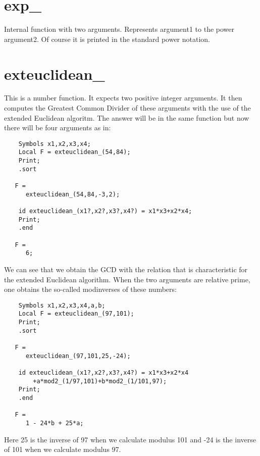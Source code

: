
\section{exp\_}
\label{funexp}
\noindent Internal function with two arguments. Represents 
argument1 to the power argument2. Of course it is printed in the standard 
power notation.


\section{exteuclidean\_}
\label{funexteuclidean}

\noindent This is a number function. It expects two positive integer 
arguments. It then computes the Greatest Common Divider of these arguments 
with the use of the extended Euclidean algoritm. The answer will be in the 
same function but now there will be four arguments as in:
\begin{verbatim}
    Symbols x1,x2,x3,x4;
    Local F = exteuclidean_(54,84);
    Print;
    .sort

   F =
      exteuclidean_(54,84,-3,2);

    id exteuclidean_(x1?,x2?,x3?,x4?) = x1*x3+x2*x4;
    Print;
    .end

   F =
      6;
\end{verbatim}
\noindent We can see that we obtain the GCD with the relation that is 
characteristic for the extended Euclidean algorithm. When the two arguments 
are relative prime, one obtains the so-called modinverses of these numbers:
\begin{verbatim}
    Symbols x1,x2,x3,x4,a,b;
    Local F = exteuclidean_(97,101);
    Print;
    .sort

   F =
      exteuclidean_(97,101,25,-24);

    id exteuclidean_(x1?,x2?,x3?,x4?) = x1*x3+x2*x4
        +a*mod2_(1/97,101)+b*mod2_(1/101,97);
    Print;
    .end

   F =
      1 - 24*b + 25*a;
\end{verbatim}
\noindent Here 25 is the inverse of 97 when we calculate modulus 101 and 
-24 is the inverse of 101 when we calculate modulus 97.

